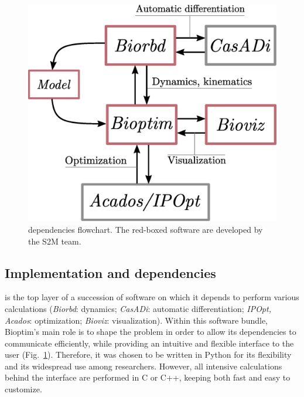 \begin{figure}[t!]
\centering
\includegraphics[width=0.9\columnwidth]{figures/dependencies.eps}
\caption{\bioptim dependencies flowchart. The red-boxed software are developed by the S2M team.}
\label{fig:dependencies}
\vspace*{-0.5cm}
\end{figure}


\subsection{Implementation and dependencies}
\bioptim is the top layer of a succession of software on which it depends to perform various calculations (\textit{Biorbd}: dynamics; \textit{CasADi}: automatic differentiation; \textit{IPOpt, Acados}: optimization; \textit{Bioviz}: visualization).
Within this software bundle, Bioptim's main role is to shape the problem in order to allow its dependencies to communicate efficiently, while providing an intuitive and flexible interface to the user (Fig.~\ref{fig:dependencies}).
Therefore, it was chosen to be written in Python for its flexibility and its widespread use among researchers.
However, all intensive calculations behind the interface are performed in C or C++, keeping \bioptim both fast and easy to customize.

